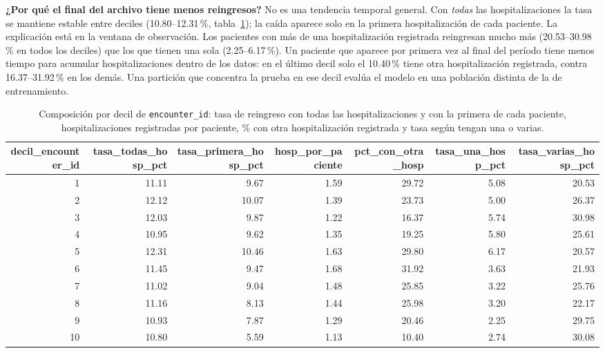 \documentclass[11pt,a4paper]{article}
\newcommand{\cod}[1]{\texttt{#1}}
\newenvironment{tablaentex}[2]{%
  \begin{table}[H]\centering\small\caption{#1}\label{#2}\begin{adjustbox}{max width=\textwidth}}%
  {\end{adjustbox}\end{table}}
\begin{document}
\textbf{¿Por qué el final del archivo tiene menos reingresos?} No es una tendencia temporal general. Con \emph{todas} las hospitalizaciones la tasa se mantiene estable entre deciles (10.80--12.31\,\%, tabla~\ref{tab:compdec}); la caída aparece solo en la primera hospitalización de cada paciente. La explicación está en la ventana de observación. Los pacientes con más de una hospitalización registrada reingresan mucho más (20.53--30.98\,\% en todos los deciles) que los que tienen una sola (2.25--6.17\,\%). Un paciente que aparece por primera vez al final del período tiene menos tiempo para acumular hospitalizaciones dentro de los datos: en el último decil solo el 10.40\,\% tiene otra hospitalización registrada, contra 16.37--31.92\,\% en los demás. Una partición que concentra la prueba en ese decil evalúa el modelo en una población distinta de la de entrenamiento.
\begin{tablaentex}{Composición por decil de \cod{encounter\_id}: tasa de reingreso con todas las hospitalizaciones y con la primera de cada paciente, hospitalizaciones registradas por paciente, \% con otra hospitalización registrada y tasa según tengan una o varias.}{tab:compdec}
\begin{tabular}{rrrrrrr}
\toprule
decil\_encounter\_id & tasa\_todas\_hosp\_pct & tasa\_primera\_hosp\_pct & hosp\_por\_paciente & pct\_con\_otra\_hosp & tasa\_una\_hosp\_pct & tasa\_varias\_hosp\_pct \\
\midrule
1 & 11.11 & 9.67 & 1.59 & 29.72 & 5.08 & 20.53 \\
2 & 12.12 & 10.07 & 1.39 & 23.73 & 5.00 & 26.37 \\
3 & 12.03 & 9.87 & 1.22 & 16.37 & 5.74 & 30.98 \\
4 & 10.95 & 9.62 & 1.35 & 19.25 & 5.80 & 25.61 \\
5 & 12.31 & 10.46 & 1.63 & 29.80 & 6.17 & 20.57 \\
6 & 11.45 & 9.47 & 1.68 & 31.92 & 3.63 & 21.93 \\
7 & 11.02 & 9.04 & 1.48 & 25.85 & 3.22 & 25.76 \\
8 & 11.16 & 8.13 & 1.44 & 25.98 & 3.20 & 22.17 \\
9 & 10.93 & 7.87 & 1.29 & 20.46 & 2.25 & 29.75 \\
10 & 10.80 & 5.59 & 1.13 & 10.40 & 2.74 & 30.08 \\
\bottomrule
\end{tabular}
\end{tablaentex}
\end{document}
